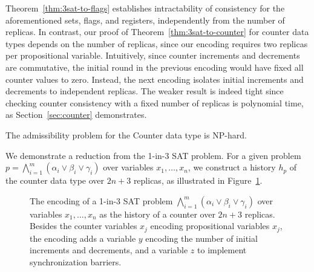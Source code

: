 Theorem~\ref{thm:3sat-to-flags} establishes intractability of consistency for the aforementioned sets, flags, and registers, independently from the number of replicas. In contrast, our proof of Theorem~\ref{thm:3sat-to-counter} for counter data types depends on the number of replicas, since our encoding requires two replicas per propositional variable. Intuitively, since counter increments and decrements are commutative, the initial round in the previous encoding would have fixed all counter values to zero. Instead, the next encoding isolates initial increments and decrements to independent replicas.
The weaker result is indeed tight since checking counter consistency with a fixed number of replicas is polynomial time, as Section~\ref{sec:counter} demonstrates.

\vspace{-1mm}
\begin{theorem}
  \label{thm:3sat-to-counter}

  The admissibility problem for the Counter data type is NP-hard.

\vspace{-1mm}
\end{theorem}

We demonstrate a reduction from the 1-in-3 SAT problem. For a given problem $p = \bigwedge_{i=1}^{m} (\alpha_i \lor \beta_i \lor \gamma_i)$ over variables $x_1, \ldots, x_n$, we construct a history $h_p$ of the counter data type over $2n+3$ replicas, as illustrated in Figure~\ref{fig:3sat-to-counter}.

    \begin{figure}[t]
      \centering
      {\scriptsize}
     \vspace{-1mm}
      \caption{The encoding of a 1-in-3 SAT problem $\bigwedge_{i=1}^{m} (\alpha_i \lor \beta_i \lor \gamma_i)$ over variables $x_1, \ldots, x_n$ as the history of a counter over $2n+3$ replicas. Besides the counter variables $x_j$ encoding propositional variables $x_j$, the encoding adds a variable $y$ encoding the number of initial increments and decrements, and a variable $z$ to implement synchronization barriers.}
      \label{fig:3sat-to-counter}
     \vspace{-4mm}
    \end{figure}

